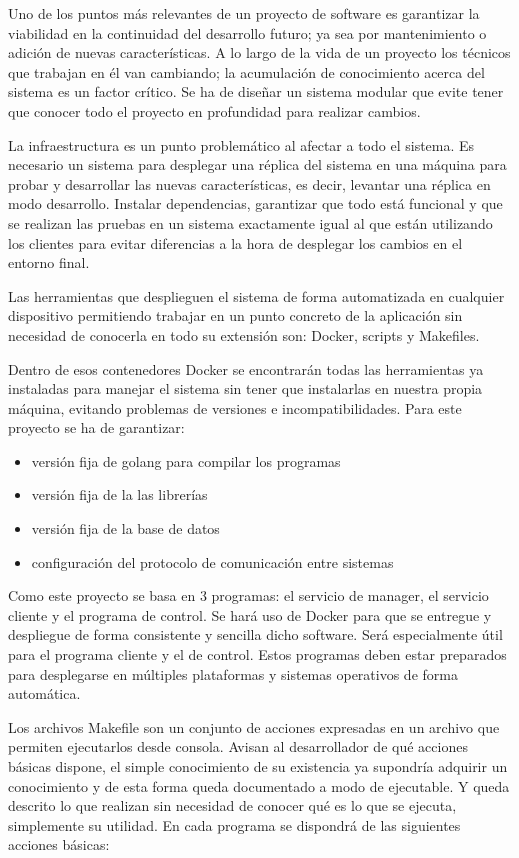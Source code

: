 
Uno de los puntos más relevantes de un proyecto de software es garantizar la viabilidad en la continuidad del desarrollo futuro;
ya sea por mantenimiento o adición de nuevas características.
A lo largo de la vida de un proyecto los técnicos que trabajan en él van cambiando;
la acumulación de conocimiento acerca del sistema es un factor crítico.
Se ha de diseñar un sistema modular que evite tener que conocer todo el proyecto en profundidad para realizar cambios.

La infraestructura es un punto problemático al afectar a todo el sistema.
Es necesario un sistema para desplegar una réplica del sistema en una máquina para probar y desarrollar las nuevas características, es decir, levantar una réplica en modo desarrollo.
Instalar dependencias, garantizar que todo está funcional y que se realizan las pruebas en un sistema exactamente igual al que están utilizando los clientes para evitar diferencias a la hora de desplegar los cambios en el entorno final.

Las herramientas que desplieguen el sistema de forma automatizada en cualquier dispositivo permitiendo trabajar en un punto concreto de la aplicación sin necesidad de conocerla en todo su extensión son: Docker, scripts y Makefiles.

Dentro de esos contenedores Docker se encontrarán todas las herramientas ya instaladas para manejar el sistema sin tener que instalarlas en nuestra propia máquina, evitando problemas de versiones e incompatibilidades.
Para este proyecto se ha de garantizar:

\begin{itemize}
    \item versión fija de golang para compilar los programas
    \item versión fija de la las librerías
    \item versión fija de la base de datos
    \item configuración del protocolo de comunicación entre sistemas
\end{itemize}

Como este proyecto se basa en 3 programas: el servicio de manager, el servicio cliente y el programa de control.
Se hará uso de Docker para que se entregue y despliegue de forma consistente y sencilla dicho software.
Será especialmente útil para el programa cliente y el de control.
Estos programas deben estar preparados para desplegarse en múltiples plataformas y sistemas operativos de forma automática.

Los archivos Makefile son un conjunto de acciones expresadas en un archivo que permiten ejecutarlos desde consola.
Avisan al desarrollador de qué acciones básicas dispone, el simple conocimiento de su existencia ya supondría adquirir un conocimiento y de esta forma queda documentado a modo de ejecutable.
Y queda descrito lo que realizan sin necesidad de conocer qué es lo que se ejecuta, simplemente su utilidad.
En cada programa se dispondrá de las siguientes acciones básicas:

